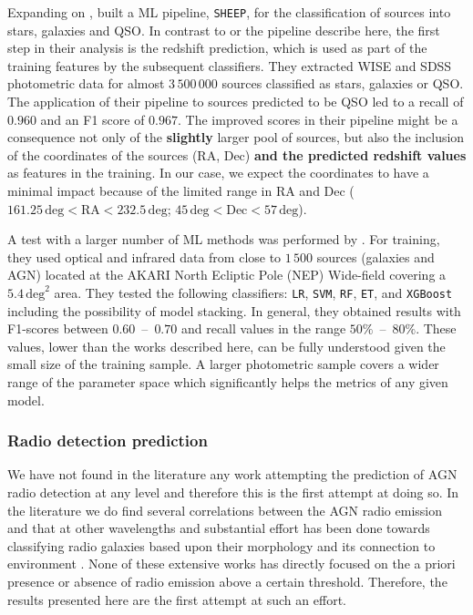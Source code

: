 \documentclass{aa}
\begin{document}
Expanding on \citet{2020A&A...639A..84C}, \citet{2022A&A...666A..87C} built a ML pipeline, \texttt{SHEEP}, for the classification of sources into stars, galaxies and QSO. In contrast to \citet{2020A&A...639A..84C} or the pipeline describe here, the first step in their analysis is the redshift prediction, which is used as part of the training features by the subsequent classifiers. They extracted WISE and SDSS \citep[DR15;][]{2019ApJS..240...23A} photometric data for almost $3\,500\,000$ sources classified as stars, galaxies or QSO. The application of their pipeline to sources predicted to be QSO led to a recall of $0.960$ and an F1 score of $0.967$. The improved scores in their pipeline might be a consequence not only of the \textbf{slightly} larger pool of sources, but also the inclusion of the coordinates of the sources (RA, Dec) \textbf{and the predicted redshift values} as features in the training. In our case, we expect the coordinates to have a minimal impact because of the limited range in RA and Dec (${161.25\,\mathrm{deg} < \mathrm{RA} <232.5\,\mathrm{deg}}$; ${45\,\mathrm{deg} < \mathrm{Dec} < 57\,\mathrm{deg}}$). %

A test with a larger number of ML methods was performed by \citet{2021A&A...651A.108P}. For training, they used optical and infrared data from close to $1\,500$ sources (galaxies and AGN) located at the AKARI North Ecliptic Pole (NEP) Wide-field \citep{2009PASJ...61..375L, 2012A&A...548A..29K} covering a $5.4\, \mathrm{deg}^{2}$ area. They tested  the following classifiers: \verb|LR|, \verb|SVM|, \verb|RF|, \verb|ET|, and \verb|XGBoost| including the possibility of model stacking. In general, they obtained results with F1-scores between $0.60$~--~$0.70$ and recall values in the range $50\%$~--~$80\%$. 
These values, lower than the works described here, can be fully understood given the small size of the training sample. A larger photometric sample covers a wider range of the parameter space which significantly helps the metrics of any given model.

\subsubsection{Radio detection prediction}\label{sec:previous_radio_detection}

We have not found in the literature any work attempting the prediction of AGN radio detection at any level and therefore this is the first attempt at doing so. In the literature we do find several correlations between the AGN radio emission and that at other wavelengths \citep[e.g. with infrared emission,][]{1985ApJ...298L...7H, 1992ARA&A..30..575C} and substantial effort has been done towards classifying radio galaxies based upon their morphology \citep[e.g.][FRI, FRII, bent jets, etc.]{2017ApJS..230...20A, 2019MNRAS.482.1211W} and its connection to environment \citep{2008A&ARv..15...67M, 2022A&ARv..30....6M}. None of these extensive works has directly focused on the a priori presence or absence of radio emission above a certain threshold. Therefore, the results presented here are the first attempt at such an effort.
\end{document}
